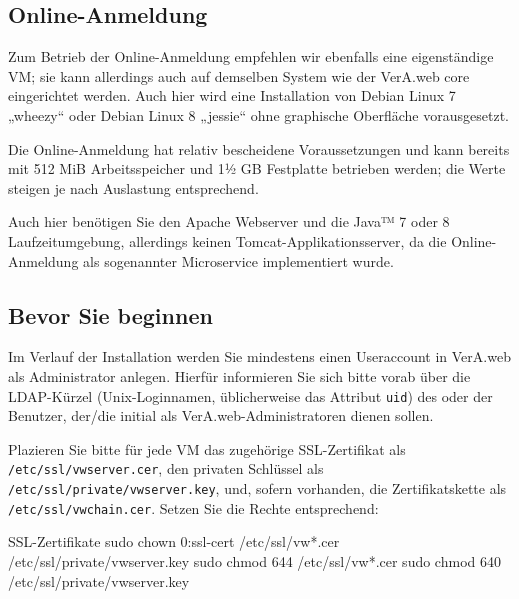 \ifoa

\subsection{Online-Anmeldung}\label{subseq:req-oa}

Zum Betrieb der Online-Anmeldung empfehlen wir ebenfalls eine
eigenständige VM; sie kann allerdings auch auf demselben System
wie der VerA.web core eingerichtet werden. Auch hier wird eine
Installation von Debian Linux 7 „wheezy“ oder Debian Linux 8
„jessie“ ohne graphische Oberfläche vorausgesetzt.

Die Online-Anmeldung hat relativ bescheidene Voraussetzungen
und kann bereits mit 512 MiB Arbeitsspeicher und 1½ GB Festplatte
betrieben werden; die Werte steigen je nach Auslastung entsprechend.

Auch hier benötigen Sie den Apache Webserver und die Java™ 7 oder 8
Laufzeitumgebung, allerdings keinen Tomcat-Applikationsserver, da
die Online-Anmeldung als sogenannter Microservice implementiert wurde.

\fi%

\ifupgradeanleitung\else%

\subsection{Bevor Sie beginnen}\label{subsec:req-prereq}

Im Verlauf der Installation werden Sie mindestens einen Useraccount
in VerA.web als Administrator anlegen. Hierfür informieren Sie sich
bitte vorab über die LDAP-Kürzel (Unix-Loginnamen, üblicherweise das
Attribut \texttt{uid}) des oder der Benutzer, der/die initial als
VerA.web-Administratoren dienen sollen.

Plazieren Sie bitte für jede VM das zugehörige SSL-Zertifikat als
\texttt{/etc/ssl/vwserver.cer}, den privaten Schlüssel als
\texttt{/etc/ssl/private/vwserver.key}, und, sofern vorhanden, die
Zertifikatskette als \texttt{/etc/ssl/vwchain.cer}. Setzen Sie die
Rechte entsprechend:\keinumbruch

\begin{minipage}{\textwidth}
\begin{lstdump}{SSL-Zertifikate}
sudo chown 0:ssl-cert /etc/ssl/vw*.cer /etc/ssl/private/vwserver.key
sudo chmod 644 /etc/ssl/vw*.cer
sudo chmod 640 /etc/ssl/private/vwserver.key
\end{lstdump}
\end{minipage}

